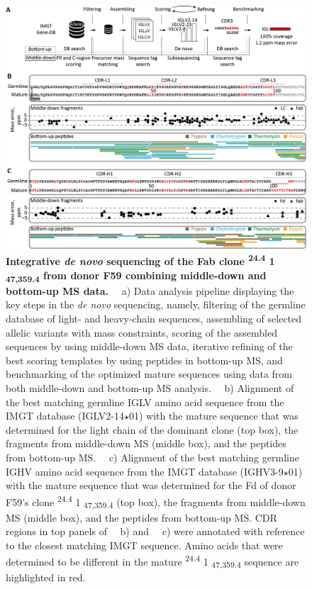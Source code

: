 \begin{figure}[!hptb]
  \center
  \includegraphics[]{Chapter.3/Figures/f4.png}
  \caption{
    \textbf{Integrative \emph{de novo} sequencing of the Fab clone \textsuperscript{24.4} 1 \textsubscript{47,359.4} from donor F59 combining middle-down and bottom-up MS data.} ~~a) Data analysis pipeline displaying the key steps in the \emph{de novo} sequencing, namely, filtering of the germline database of light- and heavy-chain sequences, assembling of selected allelic variants with mass constraints, scoring of the assembled sequences by using middle-down MS data, iterative refining of the best scoring templates by using peptides in bottom-up MS, and benchmarking of the optimized mature sequences using data from both middle-down and bottom-up MS analysis. ~~b) Alignment of the best matching germline IGLV amino acid sequence from the IMGT database (IGLV2-14$\star$01) with the mature sequence that was determined for the light chain of the dominant clone (top box), the fragments from middle-down MS (middle box), and the peptides from bottom-up MS. ~~c) Alignment of the best matching germline IGHV amino acid sequence from the IMGT database (IGHV3-9$\star$01) with the mature sequence that was determined for the Fd of donor F59’s clone \textsuperscript{24.4} 1 \textsubscript{47,359.4} (top box), the fragments from middle-down MS (middle box), and the peptides from bottom-up MS. CDR regions in top panels of ~~b) and ~~c) were annotated with reference to the closest matching IMGT sequence. Amino acids that were determined to be different in the mature \textsuperscript{24.4} 1 \textsubscript{47,359.4} sequence are highlighted in red.
  }
  \label{fig:fig3.4}
\end{figure}

